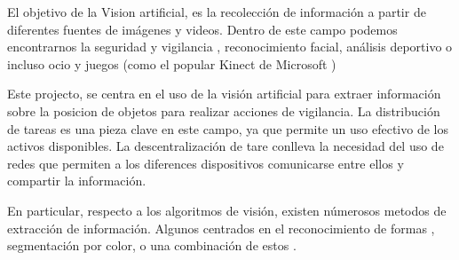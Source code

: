 El objetivo de la Vision artificial, es la recolecci\'on de informaci\'on a partir de diferentes fuentes de im\'agenes y videos. Dentro de este campo podemos encontrarnos la seguridad y vigilancia \cite{traffic_surveillance_pergamon} \cite{distributed_surveillance} \cite{vehicle_detection}, reconocimiento facial, an\'alisis deportivo o incluso ocio y juegos (como el popular Kinect de Microsoft \cite{Kinect_intro})

Este projecto, se centra en el uso de la visi\'on artificial para extraer informaci\'on sobre la posicion de objetos para realizar acciones de vigilancia. La distribuci\'on de tareas \cite{Coop_Surv_aerial_JJ} \cite{Consensus_reaching_Xiao} \cite{Adaptative_tast_Meuth} \cite{distributed_architecture_Ivan_Maza} es una pieza clave en este campo, ya que permite un uso efectivo de los activos disponibles. La descentralizaci\'on de tare \cite{descentralized_task_UAV} conlleva la necesidad del uso de redes que permiten a los diferences dispositivos comunicarse entre ellos y compartir la informaci\'on.

En particular, respecto a los algoritmos de visi\'on, existen n\'umerosos metodos de extracci\'on de informaci\'on. Algunos centrados en el reconocimiento de formas \cite{shape_using_shape_context} \cite{Vehicle_recog_markov}, segmentaci\'on por color, o una combinaci\'on de estos \cite{realtime_signal_recon_shape_color} \cite{signal_recogn_shape_color} \cite{Robust_RT_tracking_color_face_Darrell}.


